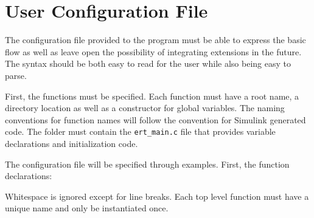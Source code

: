 
\chapter{User Configuration File} %

\label{A:ConfigFile} %


The configuration file provided to the program must be able to express the basic flow as well as leave open the possibility of integrating extensions in the future. The syntax should be both easy to read for the user while also being easy to parse.

First, the functions must be specified. Each function must have a root name, a directory location as well as a constructor for global variables. The naming conventions for function names will follow the convention for Simulink generated code. The folder must contain the \texttt{ert\_main.c} file that provides variable declarations and initialization code.

The configuration file will be specified through examples. First, the function declarations:


Whitespace is ignored except for line breaks. Each top level function must have a unique name and only be instantiated once.
